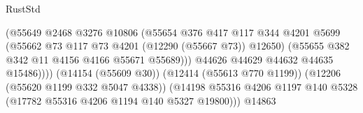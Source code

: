 \begin{lexlean}{RustStd}
\begin{coremodule}
                                                    (@55649
                                                      @2468
                                                      @3276
                                                      @10806
                                                      (@55654
                                                        @376
                                                        @417
                                                        @117
                                                        @344
                                                        @4201
                                                        @5699
                                                        (@55662
                                                          @73
                                                          @117
                                                          @73
                                                          @4201
                                                          (@12290 (@55667 @73))
                                                          @12650)
                                                        (@55655
                                                          @382
                                                          @342
                                                          @11
                                                          @4156
                                                          @4166
                                                          @55671
                                                          @55689)))
                                                    @44626
                                                    @44629
                                                    @44632
                                                    @44635
                                                    @15486))))
                                            (@14154 (@55609 @30))
                                            (@12414 (@55613 @770 @1199))
                                            (@12206 (@55620 @1199 @332 @5047 @4338))
                                            (@14198
                                              @55316
                                              @4206
                                              @1197
                                              @140
                                              @5328
                                              (@17782 @55316 @4206 @1194 @140 @5327 @19800)))
                                          @14863

\end{coremodule}
\end{lexlean}
